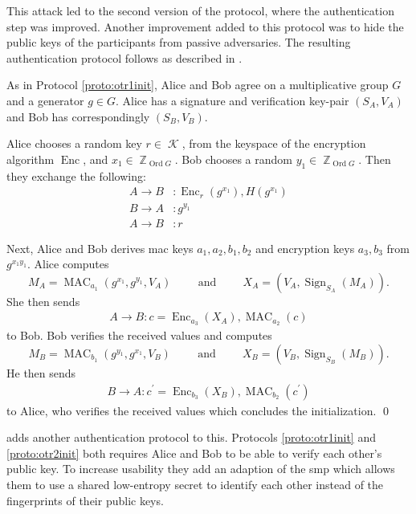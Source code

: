 \documentclass[draft]{llncs}
\DeclareMathOperator{\sign}{\mathrm{Sign}}
\DeclareMathOperator{\enc}{\mathrm{Enc}}
\DeclareMathOperator{\mac}{\mathrm{MAC}}
\DeclareMathOperator{\ord}{Ord}
\DeclareMathOperator{\Z}{\mathbb Z}
\DeclareMathOperator{\K}{\mathcal K}
\DeclareMathOperator{\textand}{\qquad and\qquad}
\begin{document}
This attack led to the second version of the protocol, where the authentication 
step was improved.
Another improvement added to this protocol was to hide the public keys of the 
participants from passive adversaries.
The resulting authentication protocol follows as described in \cite{otr2007}.

\begin{protocol}
  \label{proto:otr2init}
  As in Protocol \ref{proto:otr1init}, Alice and Bob agree on a multiplicative 
  group \(G\) and a generator \(g\in G\).
  Alice has a signature and verification key-pair \((S_A, V_A)\) and Bob has 
  correspondingly \((S_B, V_B)\).

  Alice chooses a random key \(r\in \K\), from the keyspace of the encryption 
  algorithm \(\enc\), and \(x_1\in \Z_{\ord G}\).
  Bob chooses a random \(y_1\in \Z_{\ord G}\).
  Then they exchange the following:
  \begin{align*}
    A\to B &\colon \enc_r( g^{x_1} ), H( g^{x_1} ) \\
    B\to A &\colon g^{y_1} \\
    A\to B &\colon r
  \end{align*}

  Next, Alice and Bob derives \ac{mac} keys \(a_1, a_2, b_1, b_2\) and 
  encryption keys \(a_3, b_3\) from \(g^{x_1 y_1}\).
  Alice computes \[M_A = \mac_{a_1}( g^{x_1}, g^{y_1}, V_A )\textand X_A 
  = ( V_A, \sign_{S_A}( M_A ) ).\]
  She then sends
  \begin{align*}
    A\to B\colon c = \enc_{a_3}( X_A ), \mac_{a_2}( c )
  \end{align*}
  to Bob.
  Bob verifies the received values and computes \[M_B = \mac_{b_1}( g^{y_1}, 
  g^{x_1}, V_B )\textand X_B = ( V_B, \sign_{S_B}( M_B ) ).\]
  He then sends
  \begin{align*}
    B\to A\colon c^\prime = \enc_{b_3}( X_B ), \mac_{b_2}( c^\prime )
  \end{align*}
  to Alice, who verifies the received values which concludes the 
  initialization.
  \qed
\end{protocol}

\citeauthor{otr2007} \cite{otr2007} adds another authentication protocol to 
this.
Protocols \ref{proto:otr1init} and \ref{proto:otr2init} both requires Alice and 
Bob to be able to verify each other's public key.
To increase usability they add an adaption of the \ac{smp} \cite{smp} which 
allows them to use a shared low-entropy secret to identify each other instead 
of the fingerprints of their public keys.
\end{document}
